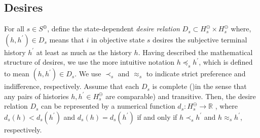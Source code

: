 \documentclass[
11pt,
titlepage,
reqno,
]{article}%
\theoremstyle{definition}
\begin{document}
%	
%	


\subsection{Desires} \label{sec: desires}
For all $s\in S^\oplus$, define the state-dependent \textit{desire relation}    $D_s\subset H^\ominus_s\times H^\ominus_s$ where, $(h,h^{\prime})\in D_s$ means that  $i$ in objective state $s$ desires the subjective terminal history $h^{\prime}$ at least as much as the history $h$. 
Having described the mathematical structure of desires, we use the more intuitive notation $h\preceq_s h^{\prime}$, which is defined to mean $(h,h^{\prime})\in D_s$. 
We use $\prec_s$ and $\approx_s$ to indicate strict preference and indifference, respectively. 
Assume that each $D_s$ is complete ()in the sense that any pairs of histories $h,h^{\prime}\in H^\ominus_s$ are comparable) and transitive. 
Then, the desire relation $D_s$ can be represented by a numerical function $d_s:H^\ominus_s\rightarrow \mathbb{R}$ , where $d_s(h)< d_s(h^\prime)$ and $d_s(h)= d_s(h^\prime)$ if and only if  $h\prec_s h^{\prime}$ and $h\approx_s h^{\prime}$, respectively.
\end{document}
